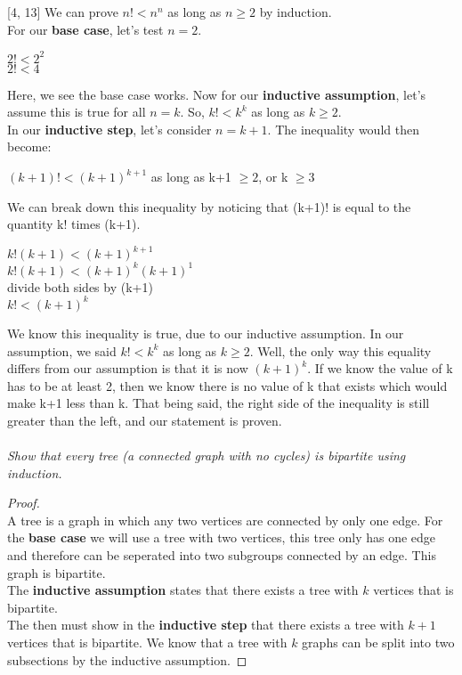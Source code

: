 \documentclass[12pt,letterpaper]{exam}
\begin{document}
[4, 13]
We can prove $n!<n^n$ as long as $n\geq 2$ by induction.\\
For our \textbf{base case}, let's test $n=2$.
\begin{center}$2! < 2^2$\\
$2! < 4$
\end{center}Here, we see the base case works. Now for our \textbf{inductive assumption}, let's assume this is true for all $n=k$. So, $k!<k^k$ as long as $k\geq 2$.\\
In our \textbf{inductive step}, let's consider $n=k+1$. The inequality would then become:
\begin{center}$(k+1)!<(k+1)^{k+1}$ as long as k+1 $ \geq 2$, or k $\geq 3$\\
\end{center}
We can break down this inequality by noticing that (k+1)! is equal to the quantity k! times (k+1).
\begin{center}$k!(k+1)<(k+1)^{k+1}$\\
$k!(k+1)<(k+1)^{k}(k+1)^1$\\
divide both sides by (k+1)\\
$k!<(k+1)^k$
\end{center}
We know this inequality is true, due to our inductive assumption. In our assumption, we said $k!<k^k$ as long as $k\geq 2$. Well, the only way this equality differs from our assumption is that it is now $(k+1)^k$. If we know the value of k has to be at least 2, then we know there is no value of k that exists which would make k+1 less than k. That being said, the right side of the inequality is still greater than the left, and our statement is proven.\\\\





\question[4, 17]
\emph{Show that every tree (a connected graph with no cycles) is bipartite using induction.}
\begin{proof}
\\
A tree is a graph in which any two vertices are connected by only one edge. For the \textbf{base case} we will use a tree with two vertices, this tree only has one edge and therefore can be seperated into two subgroups connected by an edge. This graph is bipartite.
\\
The \textbf{inductive assumption } states that there exists a tree with $k$ vertices that is bipartite.
\\
The then must show in the \textbf{inductive step} that there exists a tree with $k+1$ vertices that is bipartite. We know that a tree with $k$ graphs can be split into two subsections by the inductive assumption. 

\end{proof}
\end{document}
